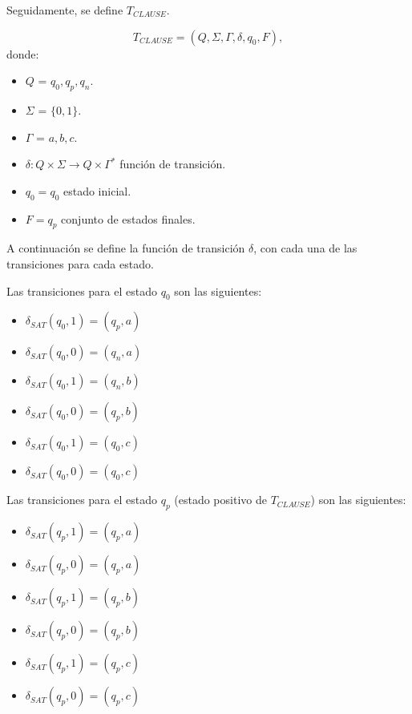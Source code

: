Seguidamente, se define $T_{CLAUSE}$.

\[
    T_{CLAUSE} = (Q, {\Sigma}, \Gamma, \delta, q_{0}, F),
\]
donde:
\begin{itemize}
    \item \(Q\) = ${q_0,q_p,q_n}$.
    \item \(\Sigma\) = $\{0,1\}$.
    \item \(\Gamma\) = ${a,b,c}$.
    \item \(\delta: Q \times \Sigma \to Q \times \Gamma^*\) función de transición.
    \item \(q_{0} = q_0\) estado inicial.
    \item \(F={q_p}\) conjunto de estados finales.
\end{itemize}

A continuación se define la función de transición $\delta$, con cada una de las transiciones para cada estado.

Las transiciones para el estado $q_0$ son las siguientes:
\begin{multicols}{2}
    \begin{itemize}
        \item $\delta_{SAT}(q_0,1)=(q_p,a)$
        \item $\delta_{SAT}(q_0,0)=(q_n,a)$
        \item $\delta_{SAT}(q_0,1)=(q_n,b)$
        \item $\delta_{SAT}(q_0,0)=(q_p,b)$
        \item $\delta_{SAT}(q_0,1)=(q_0,c)$
        \item $\delta_{SAT}(q_0,0)=(q_0,c)$
    \end{itemize}
\end{multicols}

Las transiciones para el estado $q_p$ (estado positivo de $T_{CLAUSE}$) son las siguientes:
\begin{multicols}{2}
    \begin{itemize}
        \item $\delta_{SAT}(q_{p},1)=(q_{p},a)$
        \item $\delta_{SAT}(q_{p},0)=(q_{p},a)$
        \item $\delta_{SAT}(q_{p},1)=(q_{p},b)$
        \item $\delta_{SAT}(q_{p},0)=(q_{p},b)$
        \item $\delta_{SAT}(q_{p},1)=(q_{p},c)$
        \item $\delta_{SAT}(q_{p},0)=(q_{p},c)$
    \end{itemize}
\end{multicols}

